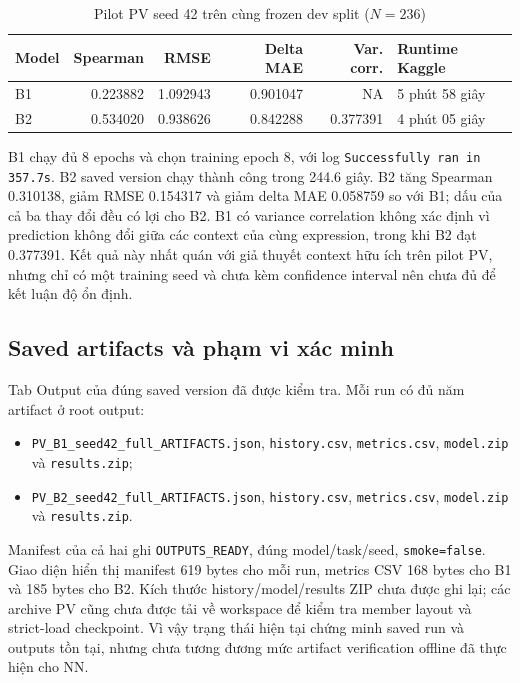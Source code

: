 \documentclass[11pt,a4paper]{article}
\newcommand{\code}[1]{\nolinkurl{#1}}
\begin{document}
\begin{table}[htbp]
\centering
\caption{Pilot PV seed 42 trên cùng frozen dev split ($N=236$)}
\small
\begin{tabularx}{\textwidth}{@{}lrrrrY@{}}
\toprule
Model & Spearman & RMSE & Delta MAE & Var. corr. & Runtime Kaggle \\
\midrule
B1 & 0.223882 & 1.092943 & 0.901047 & NA & 5 phút 58 giây \\
B2 & 0.534020 & 0.938626 & 0.842288 & 0.377391 & 4 phút 05 giây \\
\bottomrule
\end{tabularx}
\end{table}

B1 chạy đủ 8 epochs và chọn training epoch 8, với log \code{Successfully ran in 357.7s}. B2 saved version chạy thành công trong 244.6 giây. B2 tăng Spearman 0.310138, giảm RMSE 0.154317 và giảm delta MAE 0.058759 so với B1; dấu của cả ba thay đổi đều có lợi cho B2. B1 có variance correlation không xác định vì prediction không đổi giữa các context của cùng expression, trong khi B2 đạt 0.377391. Kết quả này nhất quán với giả thuyết context hữu ích trên pilot PV, nhưng chỉ có một training seed và chưa kèm confidence interval nên chưa đủ để kết luận độ ổn định.

\subsection{Saved artifacts và phạm vi xác minh}

Tab Output của đúng saved version đã được kiểm tra. Mỗi run có đủ năm artifact ở root output:
\begin{itemize}
  \item \code{PV_B1_seed42_full_ARTIFACTS.json}, \code{history.csv}, \code{metrics.csv}, \code{model.zip} và \code{results.zip};
  \item \code{PV_B2_seed42_full_ARTIFACTS.json}, \code{history.csv}, \code{metrics.csv}, \code{model.zip} và \code{results.zip}.
\end{itemize}
Manifest của cả hai ghi \code{OUTPUTS_READY}, đúng model/task/seed, \code{smoke=false}. Giao diện hiển thị manifest 619 bytes cho mỗi run, metrics CSV 168 bytes cho B1 và 185 bytes cho B2. Kích thước history/model/results ZIP chưa được ghi lại; các archive PV cũng chưa được tải về workspace để kiểm tra member layout và strict-load checkpoint. Vì vậy trạng thái hiện tại chứng minh saved run và outputs tồn tại, nhưng chưa tương đương mức artifact verification offline đã thực hiện cho NN.
\end{document}

